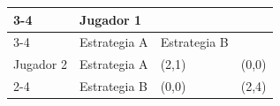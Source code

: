 \documentclass[border=8pt]{standalone}
\begin{document}
\begin{tabular}{|l|l|l|l|}
  \cline{3-4}
  \multicolumn{2}{c|}{} & \multicolumn{2}{l|}{Jugador 1} \\
  \cline{3-4}
  \multicolumn{2}{c|}{} & Estrategia A & Estrategia B \\
  \hline
  Jugador 2 & Estrategia A & (2,1) & (0,0) \\
  \cline{2-4}
            & Estrategia B & (0,0) & (2,4) \\
  \hline
\end{tabular}
\end{document}
